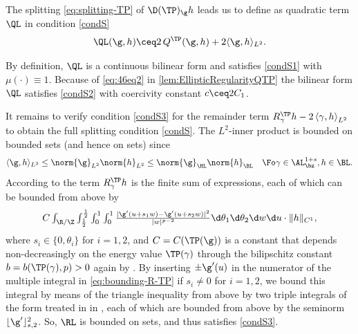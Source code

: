 \begin{refproof}
The splitting \cref{eq:splitting-TP} of $\D (\TP)_\g h$ leads us to 
define as quadratic term $\QL$ in condition \ref{condS}
\begin{equation}\label{eq:def-QL}
        \QL(\g,h) \ceq 2 \, Q^{\TP}(\g,h)+2\langle \g,h\rangle_{L^2}.
\end{equation}

By definition, $ \QL $ is a continuous bilinear form and satisfies \ref{condS1} with $\mu(\cdot)\equiv 1$. 
Because of \cref{eq:46eq2} in \cref{lem:EllipticRegularityQTP} the bilinear form $ \QL $ satisfies \ref{condS2}
with coercivity constant $c \ceq 2C_1$.

It remains to verify condition \ref{condS3} for the remainder term $ R^{\TP}_{\gamma}h-2 \left\langle \gamma,h \right\rangle_{L^2}  $
to obtain the full
splitting condition \ref{condS}. The $L^2$-inner product is bounded on bounded sets (and hence on  \Econtrolled{\TPp} sets) since
\begin{equation}\label{eq:L2-term}
\langle\g,h\rangle_{L^2}\le\norm{\g}_{L^2} \norm{h}_{L^2} \le \norm{\g}_\HL \norm{h}_\BL \quad \Fo \gamma\in \AL^{1+s}_{\bz},h\in \BL.
\end{equation}
According to \cite[Lemma 4.2]{blatt-reiter_2015a} the term $R^{\TP}_{\gamma}h$ is the finite sum
of expressions, each of which can be bounded from above by
\begin{equation}\label{eq:bounding-R-TP}
\textstyle
C\int_{\R/\Z}\int_\frac{1}{2}^\frac{1}{2}\int_0^1\int_0^1\frac{|\g'(u+s_1w)-\g'(u+s_2w)|^2}{|w|^{p-2}}\d \theta_1\d\theta_2\d w\d u\cdot \|h\|_{C^1},
\end{equation}
where $s_i\in\{0,\theta_i\}$ for $i=1,2$, and
$C=C(\TP(\g)) $ is a constant that depends non-decreasingly on the energy value $ \TP(\gamma) $ through the bilipschitz constant $ b=b(\TP(\gamma),p)>0 $ again by 
\cite[Proposition 2.7]{blatt-reiter_2015a}.
By inserting $\pm\g'(u)$ in the numerator of the multiple integral in 
\cref{eq:bounding-R-TP} if
$s_i\not= 0$ for $i=1,2$, we bound this integral by means of the triangle
inequality from above by two triple integrals of the form treated in 
 in , 
each of which
are bounded from above by the seminorm $\lfloor\g'\rfloor_{s,2}^2$.
So, $ \RL $ is bounded on \Econtrolled{\TPp} sets, and thus satisfies \ref{condS3}. 


\end{refproof}
